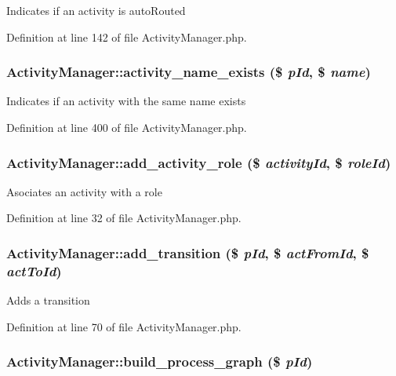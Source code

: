 Indicates if an activity is auto\-Routed 

Definition at line 142 of file Activity\-Manager.php.
\subsubsection{\setlength{\rightskip}{0pt plus 5cm}Activity\-Manager::activity\_\-name\_\-exists (\$ {\em p\-Id}, \$ {\em name})}\label{classActivityManager_a15}


Indicates if an activity with the same name exists 

Definition at line 400 of file Activity\-Manager.php.
\subsubsection{\setlength{\rightskip}{0pt plus 5cm}Activity\-Manager::add\_\-activity\_\-role (\$ {\em activity\-Id}, \$ {\em role\-Id})}\label{classActivityManager_a2}


Asociates an activity with a role 

Definition at line 32 of file Activity\-Manager.php.
\subsubsection{\setlength{\rightskip}{0pt plus 5cm}Activity\-Manager::add\_\-transition (\$ {\em p\-Id}, \$ {\em act\-From\-Id}, \$ {\em act\-To\-Id})}\label{classActivityManager_a6}


Adds a transition 

Definition at line 70 of file Activity\-Manager.php.
\subsubsection{\setlength{\rightskip}{0pt plus 5cm}Activity\-Manager::build\_\-process\_\-graph (\$ {\em p\-Id})}\label{classActivityManager_a12}


